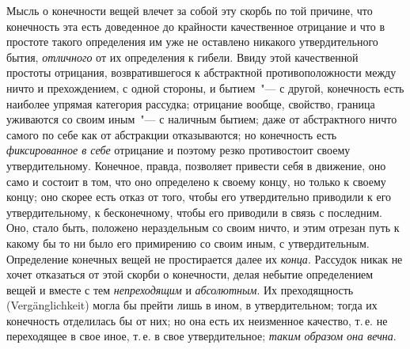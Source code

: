 Мысль о конечности вещей влечет за собой эту скорбь
по той причине, что конечность эта есть доведенное до
крайности качественное отрицание и что в простоте такого
определения им уже не оставлено никакого утвердительного
бытия, \emph{отличного} от их определения к гибели.
Ввиду этой качественной простоты отрицания, возвратившегося
к абстрактной противоположности между
ничто и прехождением, с одной стороны, и бытием~"--- с
другой, конечность есть наиболее упрямая категория рассудка;
отрицание вообще, свойство, граница уживаются
со своим иным~"--- с наличным бытием; даже от абстрактного
ничто самого по себе как от абстракции отказываются;
но конечность есть \emph{фиксированное в себе} отрицание
и поэтому резко противостоит своему утвердительному.
Конечное, правда, позволяет привести себя в движение,
оно само и состоит в том, что оно определено к
своему концу, но только к своему концу; оно скорее есть
отказ от того, чтобы его утвердительно приводили к его
утвердительному, к бесконечному, чтобы его приводили
в связь с последним. Оно, стало быть, положено нераздельным
со своим ничто, и этим отрезан путь к какому
бы то ни было его примирению со своим иным, с утвердительным.
Определение конечных вещей не простирается
далее их \emph{конца}. Рассудок никак не хочет отказаться
от этой скорби о конечности, делая небытие определением
вещей и вместе с тем \emph{непреходящим} и \emph{абсолютным}.
Их преходящность (Vergänglichkeit) могла бы прейти
лишь в ином, в утвердительном; тогда их конечность
отделилась бы от них; но она есть их неизменное качество,
т.\,е. не переходящее в свое иное, т.\,е. в свое утвердительное;
\emph{таким образом она вечна}.

